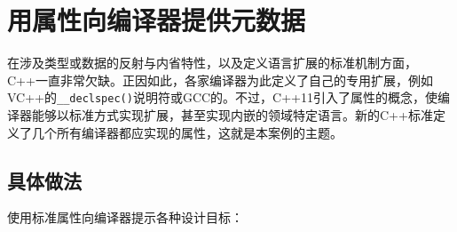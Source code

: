 
\section{用属性向编译器提供元数据}



在涉及类型或数据的反射与内省特性，以及定义语言扩展的标准机制方面，C++一直非常欠缺。正因如此，各家编译器为此定义了自己的专用扩展，例如VC++的\texttt{\_\_\allowbreak{}declspec()}说明符或GCC的。不过，C++11引入了属性的概念，使编译器能够以标准方式实现扩展，甚至实现内嵌的领域特定语言。新的C++标准定义了几个所有编译器都应实现的属性，这就是本案例的主题。



\subsection{具体做法}



使用标准属性向编译器提示各种设计目标：



